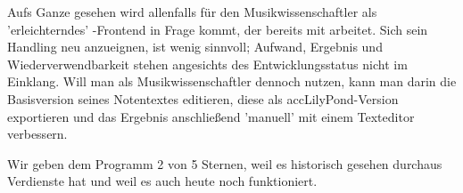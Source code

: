 Aufs Ganze gesehen wird  allenfalls für den Musikwissenschaftler als
'erleichterndes' -Frontend in Frage kommt, der bereits mit
 arbeitet. Sich sein Handling neu anzueignen, ist wenig sinnvoll;
Aufwand, Ergebnis und Wiederverwendbarkeit stehen angesichts des
Entwicklungsstatus nicht im Einklang. Will man als Musikwissenschaftler
 dennoch nutzen, kann man darin die Basisversion seines Notentextes
editieren, diese als acc{LilyPond}-Version exportieren und das Ergebnis
anschließend 'manuell' mit einem Texteditor verbessern.

Wir geben dem Programm 2 von 5 Sternen, weil es historisch gesehen durchaus
Verdienste hat und weil es auch heute noch funktioniert.


%
